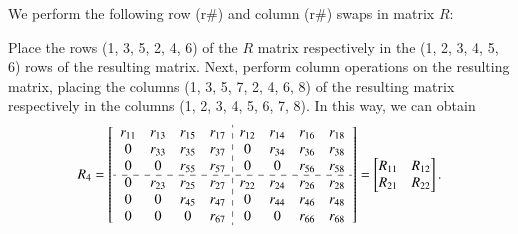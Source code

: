 \documentclass[3p]{elsarticle}
\numberwithin{equation}{section}
\begin{document}
We  perform the following row (r\#) and column (r\#) swaps in matrix $R$: 

{\color{red}Place the rows (1, 3, 5, 2, 4, 6) of the $R$ matrix respectively in the (1, 2, 3, 4, 5, 6) rows of the resulting matrix.  Next, perform column operations on the resulting matrix, placing the columns (1, 3, 5, 7, 2, 4, 6, 8) of the resulting matrix respectively in the columns (1, 2, 3, 4, 5, 6, 7, 8). In this way, we can obtain}
\[R_4 = \begin{bmatrix}
\begin{array}{cccc:cccc}
 r_{11} & r_{13} & r_{15} & r_{17} & r_{12} & r_{14} & r_{16} & r_{18}\\
 0      & r_{33} & r_{35} & r_{37} & 0      & r_{34} & r_{36} & r_{38}\\
 0      & 0      & r_{55} & r_{57} & 0      & 0      & r_{56} & r_{58}\\
 \cdashline{1-8}
 0      & r_{23} & r_{25} & r_{27} & r_{22} & r_{24} & r_{26} & r_{28}\\
 0      & 0      & r_{45} & r_{47} & 0      & r_{44} & r_{46} & r_{48}\\
 0      & 0      & 0      & r_{67} & 0      & 0      & r_{66} & r_{68}\\
\end{array}
\end{bmatrix}=\begin{bmatrix}
    R_{11} & R_{12}\\R_{21} & R_{22}
\end{bmatrix}.
\]
\iffalse
\end{document}
